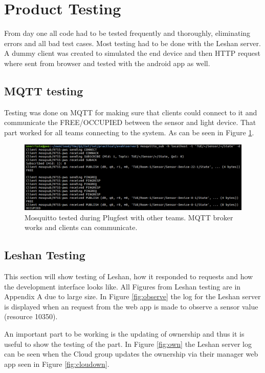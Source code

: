 \section{Product Testing}

From day one all code had to be tested frequently and thoroughly, eliminating errors and all bad test cases. Most testing had to be done with the Leshan server. A dummy client was created to simulated the end device and then HTTP request where sent from browser and tested with the android app as well.

\subsection{MQTT testing}

Testing was done on MQTT for making sure that clients could connect to it and communicate the FREE/OCCUPIED between the sensor and light device. That part worked for all teams connecting to the system. As can be seen in Figure \ref{fig:mqtt3}.
\begin{figure}[h]
	\begin{center}
		\includegraphics[width=\linewidth]{img/mqtt3}
		\caption{Mosquitto tested during Plugfest with other teams. MQTT broker works and clients can communicate.}
		\label{fig:mqtt3}
	\end{center}
\end{figure}

\subsection{Leshan Testing}

This section will show testing of Leshan, how it responded to requests and how the development interface looks like. All Figures from Leshan testing are in Appendix A due to large size. In Figure \ref{fig:observe} the log for the Leshan server is displayed when an request from the web app is made to observe a sensor value (resource 10350).

An important part to be working is the updating of ownership and thus it is useful to show the testing of the part. In Figure \ref{fig:own} the Leshan server log can be seen when the Cloud group updates the ownership via their manager web app seen in Figure \ref{fig:cloudown}.


